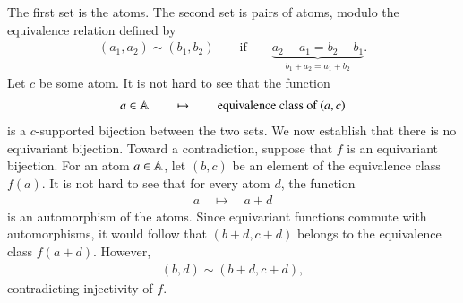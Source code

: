 {The first set is the atoms. The second set is pairs of atoms, modulo the equivalence relation defined by 
\begin{align*}
 (a_1,a_2) \sim (b_1,b_2) \qquad \text{if} \qquad \underbrace{a_2 - a_1 = b_2 - b_1}_{b_1+a_2 = a_1 + b_2}.
\end{align*}
Let $c$ be some atom. It is not hard to see that the function
\begin{align*}
 a \in \mathbb A \qquad \mapsto \qquad \text{equivalence class of $(a,c)$}
\end{align*}
is a $c$-supported bijection between the two sets. We now establish that there is no equivariant bijection. Toward a contradiction, suppose that $f$ is an equivariant bijection. For an atom $a \in \mathbb A$, let $(b,c)$ be an element of the equivalence class $f(a)$. It is not hard to see that for every atom $d$, the function
\begin{align*}
 a \quad \mapsto \quad a+d
\end{align*}
is an automorphism of the atoms. Since equivariant functions commute with automorphisms, it would follow that 
$(b+d,c+d)$ belongs to the equivalence class $f(a+d)$. However,
 \begin{align*}
 (b,d) \sim (b+d,c+d),
 \end{align*}
 contradicting injectivity of $f$. 
}



 

 




